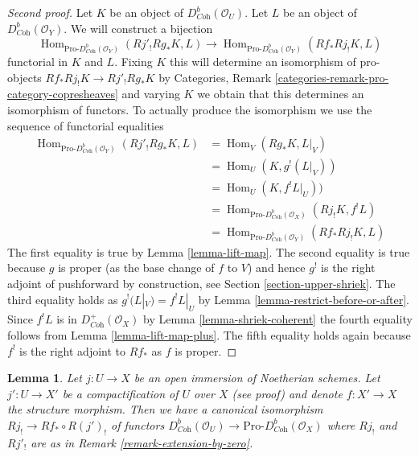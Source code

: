 \documentclass{stacks-project}
\theoremstyle{plain}
\newtheorem{lemma}[subsection]{Lemma}
\theoremstyle{definition}
\theoremstyle{remark}
\numberwithin{equation}{subsection}
\def\Hom{\mathop{\mathrm{Hom}}\nolimits}
\begin{document}
\begin{proof}[Second proof]
Let $K$ be an object of $D^b_{\textit{Coh}}(\mathcal{O}_U)$.
Let $L$ be an object of $D^b_{\textit{Coh}}(\mathcal{O}_Y)$.
We will construct a bijection
$$
\Hom_{\text{Pro-}D^b_{\textit{Coh}}(\mathcal{O}_Y)}(Rj'_!Rg_*K, L)
\longrightarrow
\Hom_{\text{Pro-}D^b_{\textit{Coh}}(\mathcal{O}_Y)}(Rf_*Rj_!K, L)
$$
functorial in $K$ and $L$. Fixing $K$ this will determine an isomorphism
of pro-objects
$Rf_*Rj_!K \to Rj'_!Rg_*K$
by Categories, Remark \ref{categories-remark-pro-category-copresheaves}
and varying $K$ we obtain that this determines
an isomorphism of functors. To actually produce the isomorphism we
use the sequence of functorial equalities
\begin{align*}
\Hom_{\text{Pro-}D^b_{\textit{Coh}}(\mathcal{O}_Y)}(Rj'_!Rg_*K, L)
& =
\Hom_V(Rg_*K, L|_V) \\
& =
\Hom_U(K, g^!(L|_V)) \\
& =
\Hom_U(K, f^!L|_U)) \\
& =
\Hom_{\text{Pro-}D^b_{\textit{Coh}}(\mathcal{O}_X)}(Rj_!K, f^!L) \\
& =
\Hom_{\text{Pro-}D^b_{\textit{Coh}}(\mathcal{O}_Y)}(Rf_*Rj_!K, L)
\end{align*}
The first equality is true by Lemma \ref{lemma-lift-map}.
The second equality is true because $g$ is proper (as the base change
of $f$ to $V$) and hence $g^!$ is the right adjoint of pushforward by
construction, see Section \ref{section-upper-shriek}.
The third equality holds as $g^!(L|_V) = f^!L|_U$ by
Lemma \ref{lemma-restrict-before-or-after}.
Since $f^!L$ is in $D^+_{\textit{Coh}}(\mathcal{O}_X)$ by
Lemma \ref{lemma-shriek-coherent} the fourth equality follows from 
Lemma \ref{lemma-lift-map-plus}. The fifth equality holds again
because $f^!$ is the right adjoint to $Rf_*$ as $f$ is proper.
\end{proof}

\begin{lemma}
\label{lemma-well-defined}
Let $j : U \to X$ be an open immersion of Noetherian schemes.
Let $j' : U \to X'$ be a compactification of $U$ over $X$ (see proof)
and denote $f : X' \to X$ the structure morphism.
Then we have a canonical isomorphism $Rj_! \to Rf_* \circ R(j')_!$
of functors $D^b_{\textit{Coh}}(\mathcal{O}_U) \to
\text{Pro-}D^b_{\textit{Coh}}(\mathcal{O}_X)$ where
$Rj_!$ and $Rj'_!$ are as in Remark \ref{remark-extension-by-zero}.
\end{lemma}
\end{document}
